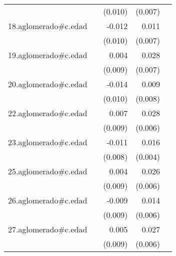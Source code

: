 {\begin{longtable}{l*{4}{D{.}{.}{-1}}}
            &                     &     (0.010)         &     (0.007)         &                     \\
\addlinespace
18.aglomerado#c.edad&                     &      -0.012         &       0.011         &                     \\
            &                     &     (0.010)         &     (0.007)         &                     \\
\addlinespace
19.aglomerado#c.edad&                     &       0.004         &       0.028\sym{***}&                     \\
            &                     &     (0.009)         &     (0.007)         &                     \\
\addlinespace
20.aglomerado#c.edad&                     &      -0.014         &       0.009         &                     \\
            &                     &     (0.010)         &     (0.008)         &                     \\
\addlinespace
22.aglomerado#c.edad&                     &       0.007         &       0.028\sym{***}&                     \\
            &                     &     (0.009)         &     (0.006)         &                     \\
\addlinespace
23.aglomerado#c.edad&                     &      -0.011         &       0.016\sym{***}&                     \\
            &                     &     (0.008)         &     (0.004)         &                     \\
\addlinespace
25.aglomerado#c.edad&                     &       0.004         &       0.026\sym{***}&                     \\
            &                     &     (0.009)         &     (0.006)         &                     \\
\addlinespace
26.aglomerado#c.edad&                     &      -0.009         &       0.014\sym{*}  &                     \\
            &                     &     (0.009)         &     (0.006)         &                     \\
\addlinespace
27.aglomerado#c.edad&                     &       0.005         &       0.027\sym{***}&                     \\
            &                     &     (0.009)         &     (0.006)         &                     \\

\end{longtable}}
